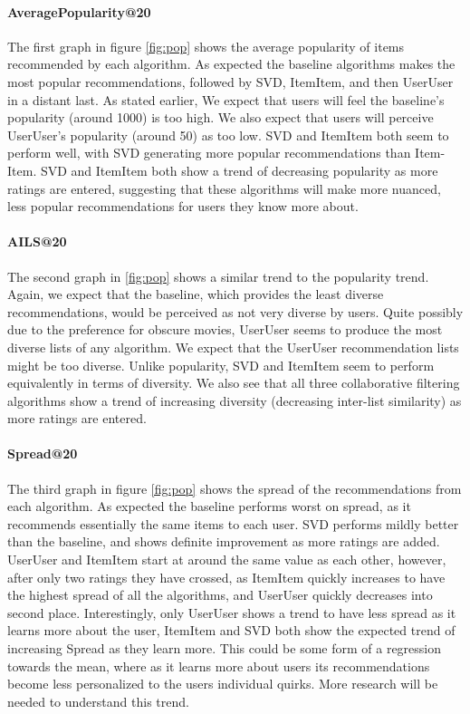 \documentclass[letterpaper]{sig-alternate}
\begin{document}
  \paragraph{AveragePopularity@20}
  The first graph in figure \ref{fig:pop} shows the average popularity of items recommended by each algorithm.
  As expected the baseline algorithms makes the most popular recommendations, followed by SVD, ItemItem, and then UserUser in a distant last.
  As stated earlier, We expect that users will feel the baseline's popularity (around 1000) is too high.
  We also expect that users will perceive UserUser's popularity (around 50) as too low.
  SVD and ItemItem both seem to perform well, with SVD generating more popular recommendations than Item-Item.
  SVD and ItemItem both show a trend of decreasing popularity as more ratings are entered, suggesting that these algorithms will make more nuanced, less popular recommendations for users they know more about.

  \paragraph{AILS@20}
  The second graph in \ref{fig:pop} shows a similar trend to the popularity trend.
  Again, we expect that the baseline, which provides the least diverse recommendations, would be perceived as not very diverse by users.
  Quite possibly due to the preference for obscure movies, UserUser seems to produce the most diverse lists of any algorithm.
  We expect that the UserUser recommendation lists might be too diverse.
  Unlike popularity, SVD and ItemItem seem to perform equivalently in terms of diversity.
  We also see that all three collaborative filtering algorithms show a trend of increasing diversity (decreasing inter-list similarity) as more ratings are entered.

  \paragraph{Spread@20}
  The third graph in figure \ref{fig:pop} shows the spread of the recommendations from each algorithm.
  As expected the baseline performs worst on spread, as it recommends essentially the same items to each user.
  SVD performs mildly better than the baseline, and shows definite improvement as more ratings are added.
  UserUser and ItemItem start at around the same value as each other, however, after only two ratings they have crossed, as ItemItem quickly increases to have the highest spread of all the algorithms, and UserUser quickly decreases into second place.
  Interestingly, only UserUser shows a trend to have less spread as it learns more about the user, ItemItem and SVD both show the expected trend of increasing Spread as they learn more.
  This could be some form of a regression towards the mean, where as it learns more about users its recommendations become less personalized to the users individual quirks.
  More research will be needed to understand this trend.
  
\end{document}
